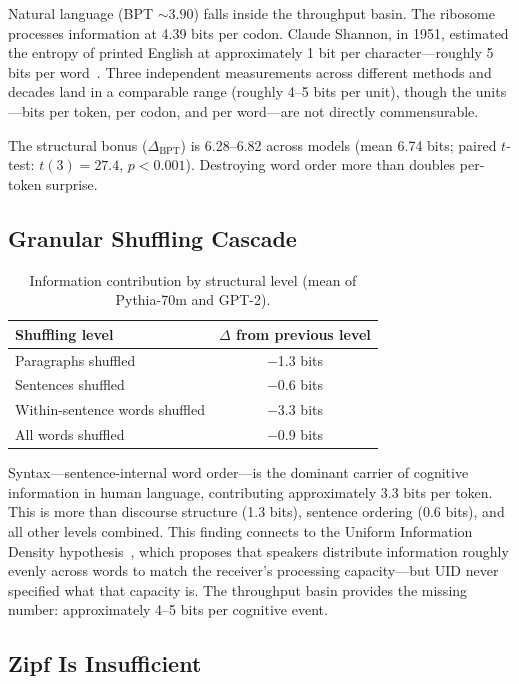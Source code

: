 \documentclass[11pt]{article}
\begin{document}
Natural language (BPT $\sim 3.90$) falls inside the throughput basin. The ribosome processes information at 4.39 bits per codon. Claude Shannon, in 1951, estimated the entropy of printed English at approximately 1 bit per character---roughly 5 bits per word~\cite{shannon1951}. Three independent measurements across different methods and decades land in a comparable range (roughly 4--5 bits per unit), though the units---bits per token, per codon, and per word---are not directly commensurable.

The structural bonus ($\Delta_{\mathrm{BPT}}$) is 6.28--6.82 across models (mean 6.74 bits; paired $t$-test: $t(3) = 27.4$, $p < 0.001$). Destroying word order more than doubles per-token surprise.

\subsection{Granular Shuffling Cascade}

\begin{table}[ht]
\centering
\caption{Information contribution by structural level (mean of Pythia-70m and GPT-2).}
\begin{tabular}{lc}
\toprule
Shuffling level & $\Delta$ from previous level \\
\midrule
Paragraphs shuffled & $-$1.3 bits \\
Sentences shuffled & $-$0.6 bits \\
Within-sentence words shuffled & $-$3.3 bits \\
All words shuffled & $-$0.9 bits \\
\bottomrule
\end{tabular}
\label{tab:cascade}
\end{table}

Syntax---sentence-internal word order---is the dominant carrier of cognitive information in human language, contributing approximately 3.3 bits per token. This is more than discourse structure (1.3 bits), sentence ordering (0.6 bits), and all other levels combined. This finding connects to the Uniform Information Density hypothesis~\cite{jaeger2010}, which proposes that speakers distribute information roughly evenly across words to match the receiver's processing capacity---but UID never specified what that capacity is. The throughput basin provides the missing number: approximately 4--5 bits per cognitive event.

\subsection{Zipf Is Insufficient}
\end{document}
